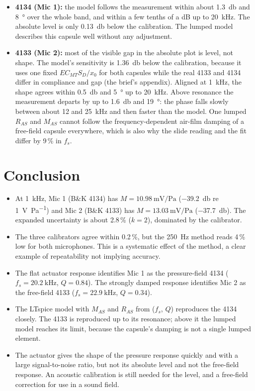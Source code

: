 \documentclass[a4paper,10pt]{article}
\begin{document}
\begin{itemize}
\item \textbf{4134 (Mic 1):} the model follows the measurement within about
\SI{1.3}{\decibel} and \SI{8}{\degree} over the whole band, and within a few tenths of a
dB up to \SI{20}{\kilo\hertz}. The absolute level is only \SI{0.13}{\decibel} below the
calibration. The lumped model describes this capsule well without any adjustment.
\item \textbf{4133 (Mic 2):} most of the visible gap in the absolute plot is level, not
shape. The model's sensitivity is \SI{1.36}{\decibel} below the calibration, because it
uses one fixed $E C_{MT} S_D/x_0$ for both capsules while the real 4133 and 4134 differ in
compliance and gap (the brief's appendix). Aligned at \SI{1}{\kilo\hertz}, the shape
agrees within \SI{0.5}{\decibel} and \SI{5}{\degree} up to \SI{20}{\kilo\hertz}. Above
resonance the measurement departs by up to \SI{1.6}{\decibel} and \SI{19}{\degree}: the
phase falls slowly between about 12 and \SI{25}{\kilo\hertz} and then faster than the
model. One lumped $R_{AS}$ and $M_{AS}$ cannot follow the frequency-dependent air-film
damping of a free-field capsule everywhere, which is also why the slide reading and the
fit differ by 9\,\% in $f_s$.
\end{itemize}

\section{Conclusion}
\begin{itemize}
\item At \SI{1}{\kilo\hertz}, Mic 1 (B\&K 4134) has $M=\SI{10.98}{\milli\volt\per\pascal}$
(\SI{-39.2}{\decibel} re \SI{1}{\volt\per\pascal}) and Mic 2 (B\&K 4133) has
$M=\SI{13.03}{\milli\volt\per\pascal}$ (\SI{-37.7}{\decibel}). The expanded uncertainty
is about 2.8\,\% ($k=2$), dominated by the calibrator.
\item The three calibrators agree within 0.2\,\%, but the \SI{250}{\hertz} method reads
4\,\% low for both microphones. This is a systematic effect of the method, a clear example
of repeatability not implying accuracy.
\item The flat actuator response identifies Mic 1 as the pressure-field 4134
($f_s=\SI{20.2}{\kilo\hertz}$, $Q=0.84$). The strongly damped response identifies Mic 2
as the free-field 4133 ($f_s=\SI{22.9}{\kilo\hertz}$, $Q=0.34$).
\item The LTspice model with $M_{AS}$ and $R_{AS}$ from ($f_s$, $Q$) reproduces the 4134
closely. The 4133 is reproduced up to its resonance; above it the lumped model reaches
its limit, because the capsule's damping is not a single lumped element.
\item The actuator gives the shape of the pressure response quickly and with a large
signal-to-noise ratio, but not its absolute level and not the free-field response.
An acoustic calibration is still needed for the level, and a free-field correction for
use in a sound field.
\end{itemize}
\end{document}
